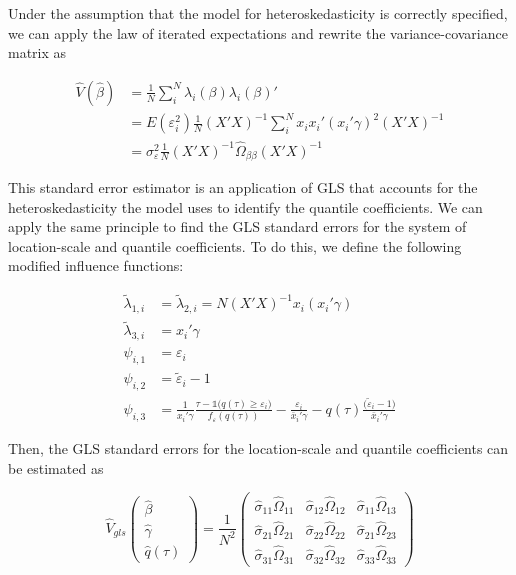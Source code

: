 \documentclass[
  authoryear,
  review,
  1p]{elsarticle}
\begin{document}
Under the assumption that the model for heteroskedasticity is correctly
specified, we can apply the law of iterated expectations and rewrite the
variance-covariance matrix as

\[\begin{aligned}
\hat V(\hat \beta) &= \frac{1}{N} \sum_i^N \lambda_{i}(\beta) \lambda_{i}(\beta)' \\
&= E(\varepsilon_i^2) \frac{1}{N}  (X'X)^{-1}  \sum_i^N x_i x_i' ( x_i'\gamma)^2 (X'X)^{-1} \\
&= \sigma^2_{\varepsilon} \frac{1}{N}  (X'X)^{-1}  \hat\Omega_{\beta\beta} (X'X)^{-1}  
\end{aligned}
\]

This standard error estimator is an application of GLS that accounts for
the heteroskedasticity the model uses to identify the quantile
coefficients. We can apply the same principle to find the GLS standard
errors for the system of location-scale and quantile coefficients. To do
this, we define the following modified influence functions:

\[\begin{aligned}
\tilde \lambda_{1,i}&=\tilde \lambda_{2,i}=N (X'X)^{-1}  x_i ( x_i'\gamma) \\  
\tilde \lambda_{3,i}&=x_i' \gamma  \\
 \psi_{i,1} &= \varepsilon_i \\
 \psi_{i,2} &= \tilde \varepsilon_i -1 \\
 \psi_{i,3} &= \frac{1}{ x_i' \gamma }\frac{\tau-\mathbb{1}\big( q(\tau)  \geq \varepsilon_i  \big) }{ f_{\varepsilon}(q(\tau))} - \frac{\varepsilon_i }{\bar x_i'\gamma} 
-  q(\tau) \frac{(\tilde \varepsilon_i -1\big)}{\bar x_i'\gamma}
\end{aligned}
\]

Then, the GLS standard errors for the location-scale and quantile
coefficients can be estimated as

\[\hat{V}_{gls}
  \begin{pmatrix}
  \hat\beta \\
  \hat\gamma \\
  \hat q(\tau)
  \end{pmatrix}
 = \frac{1}{N^2} 
 \begin{pmatrix}
 \hat\sigma_{11} \hat\Omega_{11} & \hat\sigma_{12} \hat\Omega_{12} & \hat\sigma_{11} \hat\Omega_{13} \\
 \hat\sigma_{21} \hat\Omega_{21} & \hat\sigma_{22} \hat\Omega_{22} & \hat\sigma_{21} \hat\Omega_{23} \\
 \hat\sigma_{31} \hat\Omega_{31} & \hat\sigma_{32} \hat\Omega_{32} & \hat\sigma_{33} \hat\Omega_{33}
  \end{pmatrix}
\]
\end{document}
